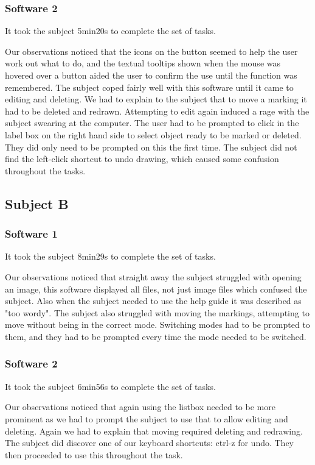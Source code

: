 \documentclass[a4paper,11pt,oneside]{article}
\begin{document}
\subsubsection{Software 2}
It took the subject 5min20s to complete the set of tasks.

Our observations noticed that the icons on the button seemed to help the user work out what to do, and the textual tooltips shown when the mouse was hovered over a button aided the user to confirm the use until the function was remembered.  The subject coped fairly well with this software until it came to editing and deleting.  We had to explain to the subject that to move a marking it had to be deleted and redrawn.  Attempting to edit again induced a rage with the subject swearing at the computer.  The user had to be prompted to click in the label box on the right hand side to select object ready to be marked or deleted.  They did only need to be prompted on this the first time. The subject did not find the left-click shortcut to undo drawing, which caused some confusion throughout the tasks.



\subsection{Subject B}
\subsubsection{Software 1}
It took the subject 8min29s to complete the set of tasks.

Our observations noticed that straight away the subject struggled with opening an image, this software displayed all files, not just image files which confused the subject.  Also when the subject needed to use the help guide it was described as "too wordy".  The subject also struggled with moving the markings, attempting to move without being in the correct mode.  Switching modes had to be prompted to them, and they had to be prompted every time the mode needed to be switched.


\subsubsection{Software 2}
It took the subject 6min56s to complete the set of tasks.

Our observations noticed that again using the listbox needed to be more prominent as we had to prompt the subject to use that to allow editing and deleting.  Again we had to explain that moving required deleting and redrawing.  The subject did discover one of our keyboard shortcuts: ctrl-z for undo.  They then proceeded to use this throughout the task.
\end{document}

